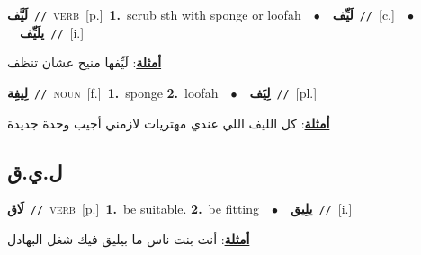 \documentclass[10pt,a4paper,twoside]{article} %
\begin{document}
\begin{multicols}{2}
{\setlength\topsep{0pt}\textbf{\foreignlanguage{arabic}{لَيَّف}}\ {\color{gray}\texttt{//}\color{black}}\ \textsc{verb}\ [p.]\ \textbf{1.}~scrub sth with sponge or loofah\ \ $\bullet$\ \ \setlength\topsep{0pt}\textbf{\foreignlanguage{arabic}{لَيِّف}}\ {\color{gray}\texttt{//}\color{black}}\ [c.]\ \ $\bullet$\ \ \setlength\topsep{0pt}\textbf{\foreignlanguage{arabic}{يلَيِّف}}\ {\color{gray}\texttt{//}\color{black}}\ [i.]\  \begin{flushright}\color{gray}\foreignlanguage{arabic}{\textbf{\underline{\foreignlanguage{arabic}{أمثلة}}}: لَيِّفها منيح عشان تنظف}\end{flushright}\color{black}} \vspace{2mm}

{\setlength\topsep{0pt}\textbf{\foreignlanguage{arabic}{لِيفِة}}\ {\color{gray}\texttt{//}\color{black}}\ \textsc{noun}\ [f.]\ \textbf{1.}~sponge  \textbf{2.}~loofah\ \ $\bullet$\ \ \setlength\topsep{0pt}\textbf{\foreignlanguage{arabic}{لِيَف}}\ {\color{gray}\texttt{//}\color{black}}\ [pl.]\  \begin{flushright}\color{gray}\foreignlanguage{arabic}{\textbf{\underline{\foreignlanguage{arabic}{أمثلة}}}: كل الليف اللي عندي مهتريات لازمني أجيب وحدة جديدة}\end{flushright}\color{black}} \vspace{2mm}

\vspace{-3mm}
\subsection*{\color{blue}\foreignlanguage{arabic}{ل.ي.ق}\color{blue}{}} 

{\setlength\topsep{0pt}\textbf{\foreignlanguage{arabic}{لَاق}}\ {\color{gray}\texttt{//}\color{black}}\ \textsc{verb}\ [p.]\ \textbf{1.}~be suitable.  \textbf{2.}~be fitting\ \ $\bullet$\ \ \setlength\topsep{0pt}\textbf{\foreignlanguage{arabic}{يلِيق}}\ {\color{gray}\texttt{//}\color{black}}\ [i.]\  \begin{flushright}\color{gray}\foreignlanguage{arabic}{\textbf{\underline{\foreignlanguage{arabic}{أمثلة}}}: أنت بنت ناس ما بيليق فيك شغل البهادل}\end{flushright}\color{black}} \vspace{2mm}


\end{multicols}
\end{document}
